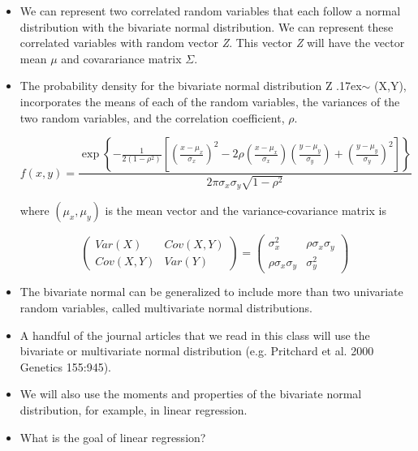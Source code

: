 \documentclass[12pt]{report}
\begin{document}
\begin{itemize}

\item We can represent two correlated random variables that each follow a normal distribution with the bivariate normal distribution. We can represent these correlated variables with random vector \textit{Z}. This vector \textit{Z} will have the vector mean $\mu$ and covarariance matrix $\Sigma$.

\item The probability density for the bivariate normal distribution Z {\raise.17ex\hbox{$\scriptstyle\sim$}} \big(X,Y\big), incorporates the means of each of the random variables, the variances of the two random variables, and the correlation coefficient, $\rho$.

\[
f(x,y)=\frac{\exp \left\{ -\frac 1{2(1-\rho ^2)}\left[ \left( \frac{x-\mu _x%
}{\sigma _x}\right) ^2-2\rho \left( \frac{x-\mu _x}{\sigma _x}\right) \left( 
\frac{y-\mu _y}{\sigma _y}\right) +\left( \frac{y-\mu _y}{\sigma _y}\right)
^2\right] \right\} }{2\pi \sigma _x\sigma _y\sqrt{1-\rho ^2}} 
\]

where $(\mu _x,\mu _y)$ is the mean vector and the variance-covariance
matrix is

\[
\left( 
\begin{array}{cc}
Var(X) & Cov(X,Y) \\ 
Cov(X,Y) & Var(Y)
\end{array}
\right) =\left( 
\begin{array}{cc}
\sigma _x^2 & \rho \sigma _x\sigma _y \\ 
\rho \sigma _x\sigma _y & \sigma _y^2
\end{array}
\right) 
\]

\bigskip
\item The bivariate normal can be generalized to include more than two univariate random variables, called multivariate normal distributions. 

\item A handful of the journal articles that we read in this class will use the bivariate or multivariate normal distribution (e.g. Pritchard et al. 2000 Genetics 155:945). 

\item We will also use the moments and properties of the bivariate normal distribution, for example, in linear regression. 

\item What is the goal of linear regression? 


\end{itemize}
\end{document}
